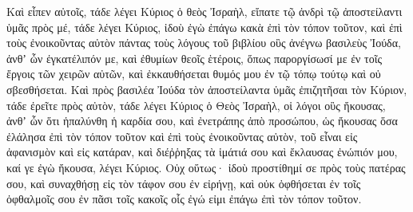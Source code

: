 {\par }{\PP {}Καὶ εἶπεν αὐτοῖς, τάδε λέγει Κύριος ὁ θεὸς Ἰσραὴλ, εἴπατε τῷ ἀνδρὶ τῷ ἀποστείλαντι ὑμᾶς πρὸς μέ,
τάδε λέγει Κύριος, ἰδοὺ ἐγὼ ἐπάγω κακὰ ἐπὶ τὸν τόπον τοῦτον, καὶ ἐπὶ τοὺς ἐνοικοῦντας αὐτὸν πάντας τοὺς λόγους τοῦ βιβλίου οὓς ἀνέγνω βασιλεὺς Ἰούδα,
ἀνθʼ ὧν ἐγκατέλιπόν με, καὶ ἐθυμίων θεοῖς ἑτέροις, ὅπως παροργίσωσί με ἐν τοῖς ἔργοις τῶν χειρῶν αὐτῶν, καὶ ἐκκαυθήσεται θυμός μου ἐν τῷ τόπῳ τούτῳ καὶ οὐ σβεσθήσεται.
Καὶ πρὸς βασιλέα Ἰούδα τὸν ἀποστείλαντα ὑμᾶς ἐπιζητῆσαι τὸν Κύριον, τάδε ἐρεῖτε πρὸς αὐτὸν, τάδε λέγει Κύριος ὁ Θεὸς Ἰσραὴλ, οἱ λόγοι οὓς ἤκουσας,
ἀνθʼ ὧν ὅτι ἡπαλύνθη ἡ καρδία σου, καὶ ἐνετράπης ἀπὸ προσώπου, ὡς ἤκουσας ὅσα ἐλάλησα ἐπὶ τὸν τόπον τοῦτον καὶ ἐπὶ τοὺς ἐνοικοῦντας αὐτὸν, τοῦ εἶναι εἰς ἀφανισμὸν καὶ εἰς κατάραν, καὶ διέῤῥηξας τὰ ἱμάτιά σου καὶ ἔκλαυσας ἐνώπιόν μου, καί γε ἐγὼ ἤκουσα, λέγει Κύριος.
Οὐχ οὕτως· ἰδοὺ προστίθημί σε πρὸς τοὺς πατέρας σου, καὶ συναχθήσῃ εἰς τὸν τάφον σου ἐν εἰρήνῃ, καὶ οὐκ ὀφθήσεται ἐν τοῖς ὀφθαλμοῖς σου ἐν πᾶσι τοῖς κακοῖς οἷς ἐγώ εἰμι ἐπάγω ἐπὶ τὸν τόπον τοῦτον.

}
